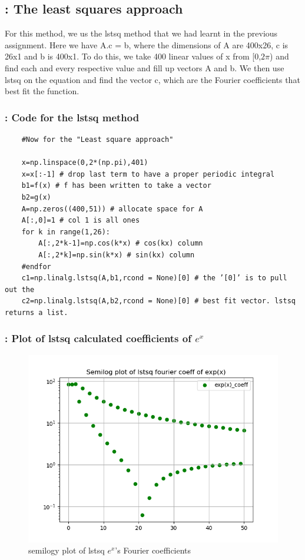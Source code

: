 \documentclass[11pt]{article}
\begin{document}
\subsection{: The least squares approach}
For this method, we us the lstsq method that we had learnt in the previous assignment. Here we have A.c = b, where the dimensions of A are 400x26, c is 26x1 and b is 400x1. To do this, we take 400 linear values of x from [0,$2\pi$) and find each and every respective value and fill up vectors A and b. We then use lstsq on the equation and find the vector c, which are the Fourier coefficients that best fit the function.

\subsubsection{: Code for the lstsq method}

\begin{verbatim}
    #Now for the "Least square approach"

    x=np.linspace(0,2*(np.pi),401)
    x=x[:-1] # drop last term to have a proper periodic integral
    b1=f(x) # f has been written to take a vector
    b2=g(x)
    A=np.zeros((400,51)) # allocate space for A
    A[:,0]=1 # col 1 is all ones
    for k in range(1,26):
    	A[:,2*k-1]=np.cos(k*x) # cos(kx) column
    	A[:,2*k]=np.sin(k*x) # sin(kx) column
    #endfor
    c1=np.linalg.lstsq(A,b1,rcond = None)[0] # the ’[0]’ is to pull out the
    c2=np.linalg.lstsq(A,b2,rcond = None)[0] # best fit vector. lstsq returns a list.
\end{verbatim}

\subsubsection{: Plot of lstsq calculated coefficients of $e^{x}$}

\begin{figure}[H]
    \centering
    \includegraphics[scale = 0.5]{Figure_7.png}
    \caption{semilogy plot of lstsq $e^{x}$'s Fourier coefficients}
\end{figure}
\end{document}

